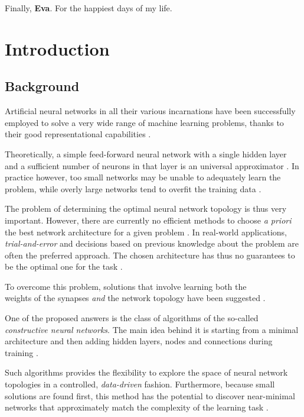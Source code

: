 \documentclass[11pt,a4paper]{report}
\begin{document}
	Finally, \textbf{Eva}. For the happiest days of my life.
	
	
	\renewcommand*\contentsname{Table of Contents}
	\tableofcontents

	\printnomenclature[0.7in]
	\listoffigures
	\listoftables
	
	
	\chapter{Introduction}
		\section{Background}
			\label{sec:background}
			Artificial neural networks in all their various incarnations have been successfully employed to solve a very wide range of machine learning problems, thanks to their good representational capabilities \cite{sharma2010constructive}.
		
			Theoretically, a simple feed-forward neural network with a single hidden layer and a sufficient number of neurons in that layer is an universal approximator \cite{hornik1989multilayer,kuurkova1992kolmogorov}. In practice however, too small networks may be unable to adequately learn the problem, while overly large networks tend to overfit the training data \cite{parekh2000constructive}.
		
			The problem of determining the optimal neural network topology is thus very important. However, there are currently no efficient methods to choose \emph{a priori} the best network architecture for a given problem \cite{parekh2000constructive}. In real-world applications, \emph{trial-and-error} and decisions based on previous knowledge about the problem are often the preferred approach. The chosen architecture has thus no guarantees to be the optimal one for the task \cite{sharma2010constructive}.
		
			To overcome this problem, solutions that involve learning both the\\weights of the synapses \emph{and} the network topology have been suggested \cite{parekh2000constructive}.
		
			One of the proposed answers is the class of algorithms of the so-called \emph{constructive neural networks}. The main idea behind it is starting from a minimal architecture and then adding hidden layers, nodes and connections during training \cite{kotsiantis2007supervised,sharma2010constructive}.
		
			Such algorithms provides the flexibility to explore the space of neural network topologies in a controlled, \emph{data-driven} fashion. Furthermore, because small solutions are found first, this method has the potential to discover near-minimal networks that approximately match the complexity of the learning task \cite{parekh2000constructive}.
		
\end{document}
